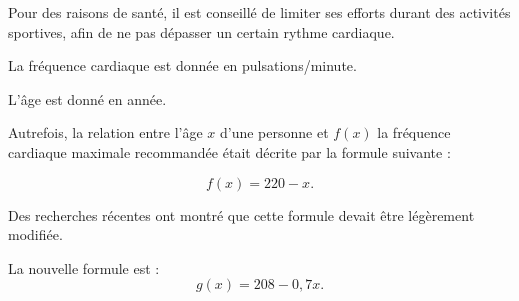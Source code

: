 \documentclass[10pt]{article}
\begin{document}
\setlength\parindent{0mm}
\pagestyle{fancy}
\thispagestyle{empty}
    
    
    




\medskip

Pour des raisons de santé, il est conseillé de limiter ses efforts durant des activités sportives, afin de ne pas dépasser un certain rythme cardiaque.

La fréquence cardiaque est donnée en pulsations/minute.

L'âge est donné en année.

\smallskip

Autrefois, la relation entre l'âge $x$ d'une personne et $f(x)$ la fréquence cardiaque maximale recommandée était décrite par la formule suivante :

\[f(x) = 220 - x.\]

Des recherches récentes ont montré que cette formule devait être légèrement modifiée.

La nouvelle formule est :
\[g(x) = 208 - 0,7x.\]
\end{document}
